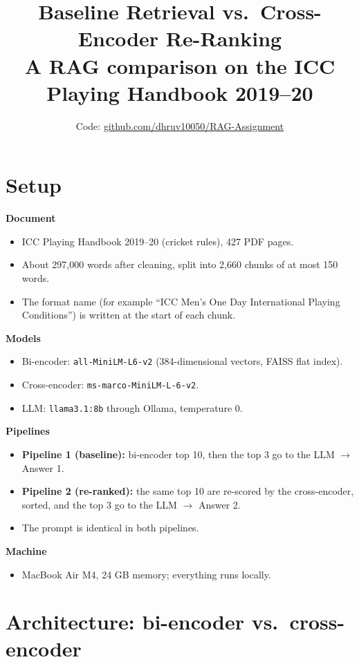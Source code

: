 \documentclass[10pt,a4paper]{article}
\title{Baseline Retrieval vs.\ Cross-Encoder Re-Ranking\\[2pt]\large A RAG comparison on the ICC Playing Handbook 2019--20}
\author{Code: \href{https://github.com/dhruv10050/RAG-Assignment}{github.com/dhruv10050/RAG-Assignment}}
\date{}
\newcommand{\code}[1]{\texttt{#1}}
\begin{document}
\maketitle
\thispagestyle{empty}
\vspace{-3em}

\section*{Setup}

\textbf{Document}
\begin{itemize}
\item ICC Playing Handbook 2019--20 (cricket rules), 427 PDF pages.
\item About 297,000 words after cleaning, split into 2,660 chunks of at most 150 words.
\item The format name (for example ``ICC Men's One Day International Playing Conditions'') is written at the start of each chunk.
\end{itemize}

\textbf{Models}
\begin{itemize}
\item Bi-encoder: \code{all-MiniLM-L6-v2} (384-dimensional vectors, FAISS flat index).
\item Cross-encoder: \code{ms-marco-MiniLM-L-6-v2}.
\item LLM: \code{llama3.1:8b} through Ollama, temperature 0.
\end{itemize}

\textbf{Pipelines}
\begin{itemize}
\item \textbf{Pipeline 1 (baseline):} bi-encoder top 10, then the top 3 go to the LLM $\rightarrow$ Answer 1.
\item \textbf{Pipeline 2 (re-ranked):} the same top 10 are re-scored by the cross-encoder, sorted, and the top 3 go to the LLM $\rightarrow$ Answer 2.
\item The prompt is identical in both pipelines.
\end{itemize}

\textbf{Machine}
\begin{itemize}
\item MacBook Air M4, 24 GB memory; everything runs locally.
\end{itemize}

\section{Architecture: bi-encoder vs.\ cross-encoder}
\end{document}
